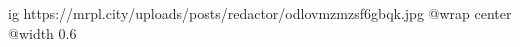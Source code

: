  
 
 
 
 

\ifcmt
  ig https://mrpl.city/uploads/posts/redactor/odlovmzmzsf6gbqk.jpg
  @wrap center
  @width 0.6
\fi
